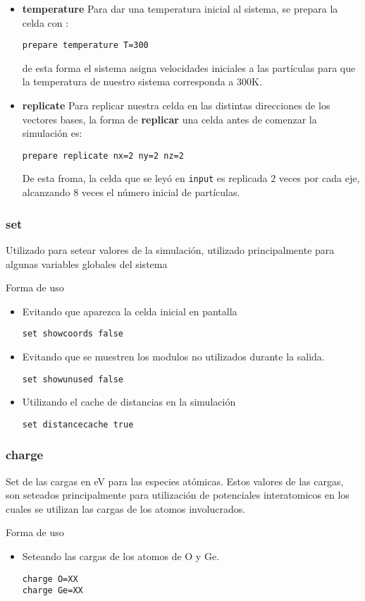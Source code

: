 \documentclass[a4paper,10pt]{scrbook}
\newcommand{\control}[1]{\begin{center}\begin{minipage}{10cm}\texttt{#1}\end{minipage}\end{center}}
\begin{document}
\begin{itemize}
 \item \textbf{temperature}
Para dar una temperatura inicial al sistema, se prepara la celda con :
\control{prepare temperature T=300}
de esta forma el sistema asigna velocidades iniciales a las part\'iculas para que la temperatura de nuestro sistema corresponda a 300K.
 \item \textbf{replicate}
Para replicar nuestra celda en las distintas direcciones de los vectores bases, la forma de \textbf{replicar} una celda antes de comenzar la simulaci\'on es:
\control{prepare replicate nx=2 ny=2 nz=2}
De esta froma, la celda que se ley\'o en \verb|input| es replicada 2 veces por cada eje, alcanzando 8 veces el n\'umero inicial de part\'iculas.
\end{itemize}

\subsubsection{set}
Utilizado para setear valores de la simulaci\'on, utilizado principalmente para algunas variables globales del sistema

Forma de uso

\begin{itemize}
 \item Evitando que aparezca la celda inicial en pantalla
\control{set showcoords false}
 \item Evitando que se muestren los modulos no utilizados durante la salida.
\control{set showunused false}
 \item Utilizando el cache de distancias en la simulaci\'on
\control{set distancecache true}
\end{itemize}

\subsubsection{charge}
Set de las cargas en eV para las especies at\'omicas. Estos valores de las cargas, son seteados principalmente para utilizaci\'on de potenciales interatomicos en los cuales se utilizan las cargas de los atomos involucrados.


Forma de uso

\begin{itemize}
 \item Seteando las cargas de los atomos de O y Ge.
\control{charge O=XX \\ charge Ge=XX}
\end{itemize}
\end{document}

